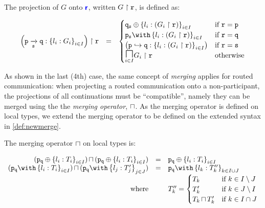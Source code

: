 \begin{definition}[Projection]
The projection of $G$ onto ${\color{blue}\bm{\mathsf{r}}}$,
written ${G} \upharpoonright {\mathtt{r}}$, is defined as:

\doublespacing
\[
\begin{array}{>{\displaystyle}rc>{\displaystyle}l}

\proj{
\left(\groute{p}{q}{s}{l_i: G_i}{i \in I}\right)
}{r} & = & 
\begin{cases}
\tselproxy{q}{s}{l_i: (\proj{G_i}{r})}{i \in I}
	& \text{if} ~ \mrole{r} = \mrole{p} \\
\tbraproxy{p}{s}{l_i: (\proj{G_i}{r})}{i \in I}
	& \text{if} ~ \mrole{r} = \mrole{q} \\
\router{p}{q}{l_i: (\proj{G_i}{r})}{i \in I}
	& \text{if} ~ \mrole{r} = \mrole{s} \\
\underset{i \in I}{\MERGEOP}\proj{G_i}{r}
	& \text{otherwise} \\
\end{cases}
\\

\end{array}
\]
\singlespacing

\label{def:newprojection}
\end{definition}

As shown in the last (4th) case, 
the same concept of \textit{merging}
applies for routed communication:
when projecting a routed communication
onto a non-participant, the projections of
all continuations must be ``compatible'',
namely they can be merged using the
the \textit{merging operator}, $\sqcap$.
As the merging operator is defined on local
types, we extend the merging operator to be defined
on the extended syntax in \cref{def:newmerge}.

\begin{definition}
The merging operator $\sqcap$ on local types
is:

\doublespacing
\[
\begin{array}{rcl}
\tmerge
{(\tselproxy{p}{q}{l_i: T_i}{i \in I})}
{(\tselproxy{p}{q}{l_i: T_i}{i \in I})}
	& = & \tselproxy{p}{q}{l_i: T_i}{i \in I} \\
	
\tmerge
{(\tbraproxy{p}{q}{l_i: T_i}{i \in I})}
{(\tbraproxy{p}{q}{l_j: T'_j}{j \in J})}
	& = & \tbraproxy{p}{q}{l_k: T''_k}{k \in I \cup J} \\
\text{where} & & T''_k = \begin{cases}
T_k & \text{if} ~ k \in I \setminus J \\
T'_k & \text{if} ~ k \in J \setminus I \\
\tmerge{T_k}{T'_k} & \text{if} ~ k \in I \cap J \\
\end{cases} \\
\end{array}
\]
\singlespacing

\label{def:newmerge}
\end{definition}

